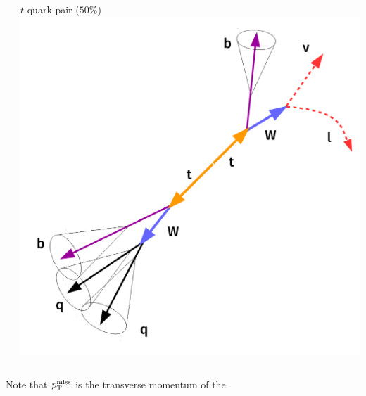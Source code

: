 \documentclass[aspectratio=169,xcolor=dvipsnames,,table,compress]{beamer}
\begin{document}
\begin{frame}[t]
\begin{columns}
\begin{column}{0.33\textwidth}
  \end{column}
  \begin{column}{0.33\textwidth}
    \centering
    $t$ quark pair ($50\%$) \\
    \includegraphics[width=\textwidth]{../figures/talk/ttsr.pdf} \pause
  \end{column}
  \end{columns}
  {\large
    Note that $p_\text{T}^\text{miss}$ is the transverse momentum of the 
  }
\end{frame}
\end{document}
